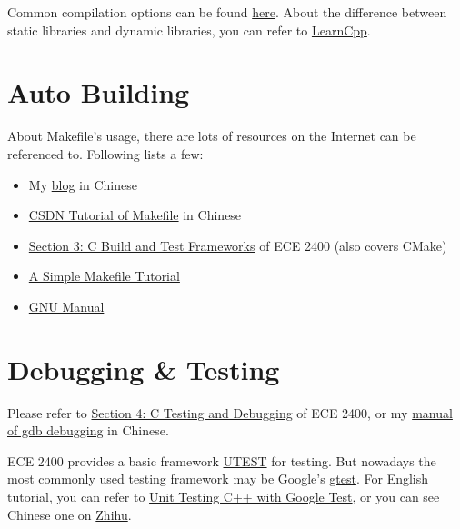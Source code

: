 \documentclass[english]{../TexTemplate/thesis}
\begin{document}
Common compilation options can be found \href{https://caiorss.github.io/C-Cpp-Notes/compiler-flags-options.html}{here}.
About the difference between static libraries and dynamic libraries, you can refer to \href{https://www.learncpp.com/cpp-tutorial/introduction-to-the-compiler-linker-and-libraries/}{LearnCpp}.

\section{Auto Building}
About Makefile's usage, there are lots of resources on the Internet can be referenced to.
Following lists a few:
\begin{itemize}
	\item My \href{https://chhzh123.github.io/blogs/2019-02-24-makefile/}{blog} in Chinese
	\item \href{https://blog.csdn.net/weixin_38391755/article/details/80380786}{CSDN Tutorial of Makefile} in Chinese
	\item \href{https://cornell-ece2400.github.io/ece2400-docs/ece2400-sec3-c-build-test/}{Section 3: C Build and Test Frameworks} of ECE 2400 (also covers CMake)
	\item \href{http://www.cs.colby.edu/maxwell/courses/tutorials/maketutor/}{A Simple Makefile Tutorial}
	\item \href{https://www.gnu.org/software/make/manual/make.html#Reference}{GNU Manual}
\end{itemize}

\section{Debugging \& Testing}
Please refer to \href{https://cornell-ece2400.github.io/ece2400-docs/ece2400-sec4-c-test-debug/}{Section 4: C Testing and Debugging} of ECE 2400, or my \href{https://chhzh123.github.io/blogs/2019-03-16-gdb/}{manual of gdb debugging} in Chinese.

ECE 2400 provides a basic framework \href{https://cornell-ece2400.github.io/ece2400-docs/ece2400-sec4-c-test-debug/}{UTEST} for testing.
But nowadays the most commonly used testing framework may be Google's \href{https://github.com/google/googletest}{gtest}.
For English tutorial, you can refer to \href{https://blog.jetbrains.com/rscpp/unit-testing-google-test/}{Unit Testing C++ with Google Test}, or you can see Chinese one on \href{https://www.zhihu.com/question/27313846/answer/130954707}{Zhihu}.
\end{document}
